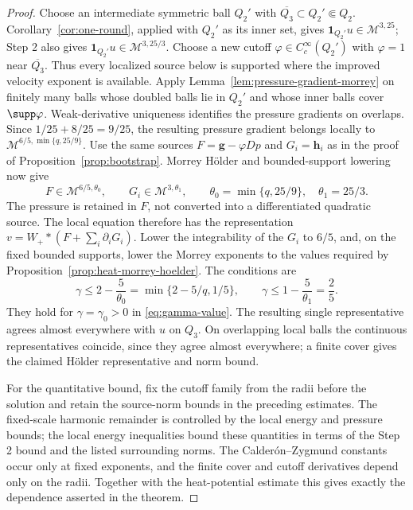 \documentclass[11pt,reqno]{amsart}
\begin{document}
\begin{proof}
Choose an intermediate symmetric ball $Q_2'$ with
$\overline{Q_3}\subset Q_2'\Subset Q_2$.
Corollary~\ref{cor:one-round}, applied with $Q_2'$ as its inner set,
gives $\mathbf1_{Q_2'}u\in\mathcal M^{3,25}$; Step 2 also gives
$\mathbf1_{Q_2'}u\in\mathcal M^{3,25/3}$.
Choose a new cutoff $\varphi\in C_c^\infty(Q_2')$ with
$\varphi=1$ near $\overline{Q_3}$. Thus every localized source below is supported where
the improved velocity exponent is available.
Apply Lemma~\ref{lem:pressure-gradient-morrey} on finitely many balls
whose doubled balls lie in $Q_2'$ and whose inner balls cover
$\supp\varphi$.
Weak-derivative uniqueness identifies the pressure gradients on overlaps.
Since $1/25+8/25=9/25$, the resulting pressure gradient belongs locally to
$\mathcal M^{6/5,\min\{q,25/9\}}$.
Use the same sources $F=\mathbf g-\varphi Dp$ and $G_i=\mathbf h_i$
as in the proof of Proposition~\ref{prop:bootstrap}. Morrey H\"older
and bounded-support lowering now give
\[
 F\in\mathcal M^{6/5,\theta_0},\qquad
 G_i\in\mathcal M^{3,\theta_1},\qquad
 \theta_0=\min\{q,25/9\},\quad \theta_1=25/3.
\]
The pressure is retained in $F$, not converted into a differentiated
quadratic source. The local equation therefore has the representation
$v=W_+*(F+\sum_i\partial_iG_i)$.
Lower the integrability of the $G_i$ to $6/5$, and, on the fixed bounded
supports, lower the Morrey exponents to the values required by
Proposition~\ref{prop:heat-morrey-hoelder}. The conditions are
\[
 \gamma\le 2-\frac5{\theta_0}
       =\min\{2-5/q,1/5\},\qquad
 \gamma\le 1-\frac5{\theta_1}=\frac25 .
\]
They hold for $\gamma=\gamma_0>0$ in \eqref{eq:gamma-value}.
The resulting single representative agrees almost everywhere with $u$
on $Q_3$. On overlapping local balls the continuous representatives
coincide, since they agree almost everywhere; a finite cover gives the
claimed H\"older representative and norm bound.

For the quantitative bound, fix the cutoff family from the radii before
the solution and retain the source-norm bounds in the preceding estimates.
The fixed-scale harmonic remainder is controlled by the local energy and
pressure bounds; the local energy inequalities bound these quantities
in terms of the Step 2 bound and the listed surrounding norms.
The Calder\'on--Zygmund constants occur only at fixed exponents, and the
finite cover and cutoff derivatives depend only on the radii.
Together with the heat-potential estimate this gives exactly the dependence
asserted in the theorem.
\end{proof}
\end{document}
